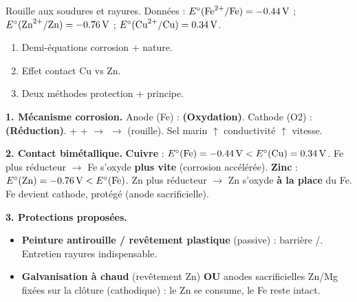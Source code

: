 \documentclass[11pt]{article}
\begin{document}
\begin{exoresolu}
Rouille aux soudures et rayures. Données : $E^\circ(\ce{Fe^2+}/\ce{Fe}) = \SI{-0,44}{V}$ ; $E^\circ(\ce{Zn^2+}/\ce{Zn}) = \SI{-0,76}{V}$ ; $E^\circ(\ce{Cu^2+}/\ce{Cu}) = \SI{+0,34}{V}$.
\begin{enumerate}
\item Demi-équations corrosion + nature.
\item Effet contact Cu vs Zn.
\item Deux méthodes protection + principe.
\end{enumerate}
\tcblower
\textbf{1. Mécanisme corrosion.}
Anode (Fe) :  \textbf{(Oxydation)}.
Cathode (O2) :  \textbf{(Réduction)}.
 +  +  $\rightarrow$  $\rightarrow$  (rouille). Sel marin $\uparrow$ conductivité $\uparrow$ vitesse.

\textbf{2. Contact bimétallique.}
\textbf{Cuivre} : $E^\circ(\ce{Fe}) = \SI{-0,44}{V} < E^\circ(\ce{Cu}) = \SI{+0,34}{V}$. Fe plus réducteur $\rightarrow$ Fe s'oxyde \textbf{plus vite} (corrosion accélérée).
\textbf{Zinc} : $E^\circ(\ce{Zn}) = \SI{-0,76}{V} < E^\circ(\ce{Fe})$. Zn plus réducteur $\rightarrow$ Zn s'oxyde \textbf{à la place} du Fe. Fe devient cathode, protégé (anode sacrificielle).

\textbf{3. Protections proposées.}
\begin{itemize}
\item \textbf{Peinture antirouille / revêtement plastique} (passive) : barrière /. Entretien rayures indispensable.
\item \textbf{Galvanisation à chaud} (revêtement Zn) \textbf{OU} anodes sacrificielles Zn/Mg fixées sur la clôture (cathodique) : le Zn se consume, le Fe reste intact.
\end{itemize}
\end{exoresolu}
\end{document}
